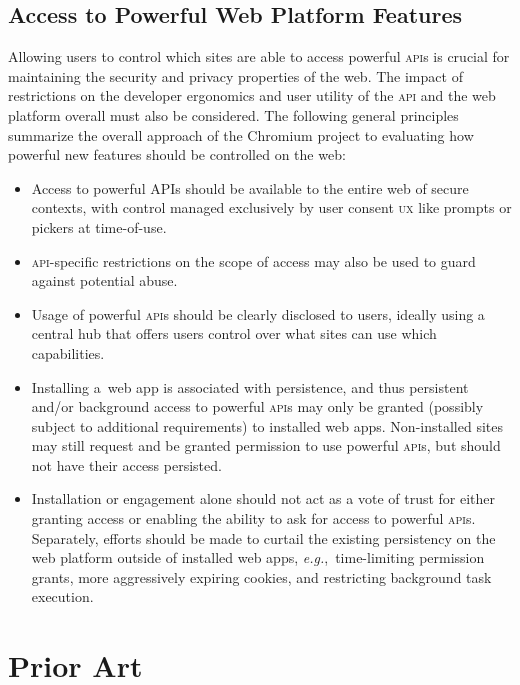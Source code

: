 \documentclass[sigconf]{acmart}
\begin{document}
\subsection{Access to Powerful Web Platform Features}

Allowing users to control which sites are able to access powerful \textsc{api}s
is crucial for maintaining the security and privacy properties of the web.
The impact of restrictions on the developer ergonomics and user utility
of the \textsc{api} and the web platform overall must also be considered.
The following general principles~\cite{ng19} summarize the overall approach of the Chromium project
to evaluating how powerful new features should be controlled on the web:

\begin{itemize}
  \item Access to powerful APIs should be available to the entire web of secure contexts,
    with control managed exclusively by user consent \textsc{ux} like prompts or pickers at time-of-use.
  \item \textsc{api}-specific restrictions on the scope of access may also be used
    to guard against potential abuse.
  \item Usage of powerful \textsc{api}s should be clearly disclosed to users,
    ideally using a central hub that offers users control over what sites
    can use which capabilities.
  \item Installing a~web app is associated with persistence,
    and thus persistent and/or background access to powerful \textsc{api}s
    may only be granted (possibly subject to additional requirements) to installed web apps.
    Non-installed sites may still request and be granted permission to use powerful \textsc{api}s,
    but should not have their access persisted.
  \item Installation or engagement alone should not act as a vote of trust
    for either granting access or enabling the ability to ask for access to powerful \textsc{api}s.
    Separately, efforts should be made to curtail the existing persistency
    on the web platform outside of installed web apps, \textit{e.g.},\ time-limiting permission grants,
    more aggressively expiring cookies, and restricting background task execution.
\end{itemize}

\section{Prior Art}
\end{document}

